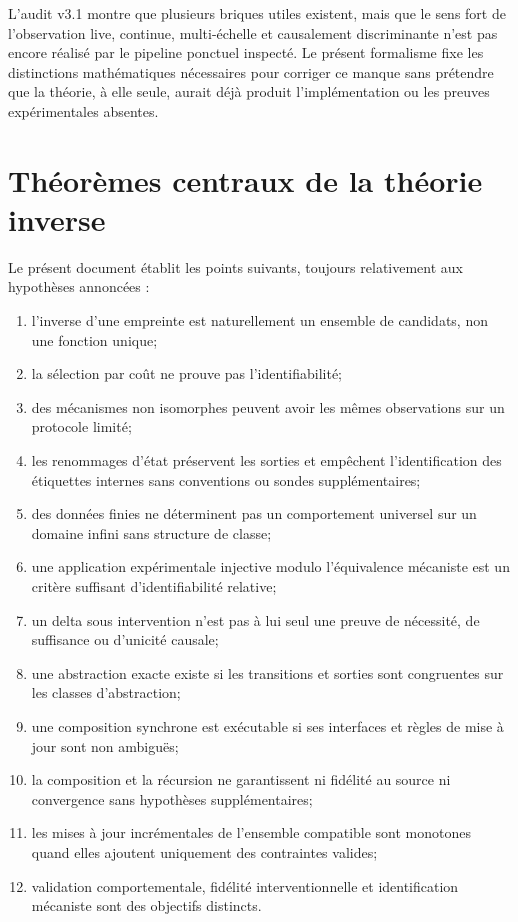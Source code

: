 \documentclass[11pt,oneside]{book}
\theoremstyle{definition}
\theoremstyle{remark}
\newcommand{\1}{\mathbf 1}
\begin{document}
L'audit v3.1 montre que plusieurs briques utiles existent, mais que le sens fort de l'observation live, continue, multi-échelle et causalement discriminante n'est pas encore réalisé par le pipeline ponctuel inspecté. Le présent formalisme fixe les distinctions mathématiques nécessaires pour corriger ce manque sans prétendre que la théorie, à elle seule, aurait déjà produit l'implémentation ou les preuves expérimentales absentes.

\section*{Théorèmes centraux de la théorie inverse}
Le présent document établit les points suivants, toujours relativement aux hypothèses annoncées :
\begin{enumerate}
\item l'inverse d'une empreinte est naturellement un ensemble de candidats, non une fonction unique;
\item la sélection par coût ne prouve pas l'identifiabilité;
\item des mécanismes non isomorphes peuvent avoir les mêmes observations sur un protocole limité;
\item les renommages d'état préservent les sorties et empêchent l'identification des étiquettes internes sans conventions ou sondes supplémentaires;
\item des données finies ne déterminent pas un comportement universel sur un domaine infini sans structure de classe;
\item une application expérimentale injective modulo l'équivalence mécaniste est un critère suffisant d'identifiabilité relative;
\item un delta sous intervention n'est pas à lui seul une preuve de nécessité, de suffisance ou d'unicité causale;
\item une abstraction exacte existe si les transitions et sorties sont congruentes sur les classes d'abstraction;
\item une composition synchrone est exécutable si ses interfaces et règles de mise à jour sont non ambiguës;
\item la composition et la récursion ne garantissent ni fidélité au source ni convergence sans hypothèses supplémentaires;
\item les mises à jour incrémentales de l'ensemble compatible sont monotones quand elles ajoutent uniquement des contraintes valides;
\item validation comportementale, fidélité interventionnelle et identification mécaniste sont des objectifs distincts.
\end{enumerate}
\end{document}
